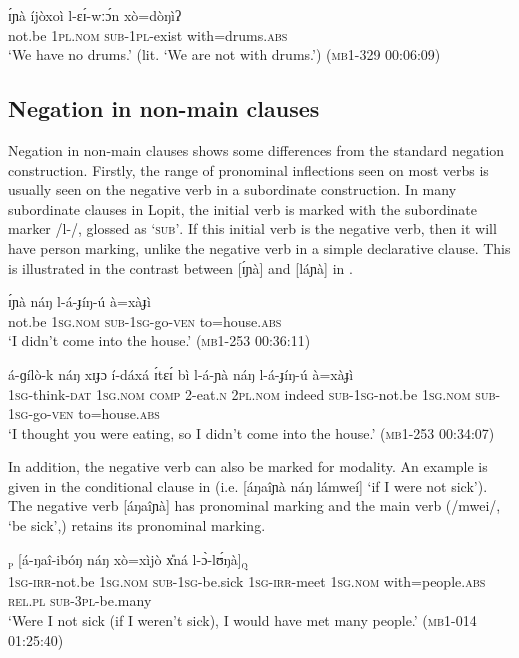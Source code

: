 \documentclass[output=paper,colorlinks,citecolor=brown,draftmode]{langscibook}
\begin{document}
\ea\label{ex:lop:47}
        \gll ɪ́ɲà íjòxoì l-ɛɪ́-wːɔ́n xò=dòŋìʔ  \\ 
             not.be 1\textsc{pl.nom} \textsc{sub-1pl}{}-exist with=drums.\textsc{abs} \\
        \glt ‘We have no drums.’ (lit. ‘We are not with drums.’)   (\textsc{mb1-329} \textsc{00}:06:09)
\z


\subsection{Negation in non-main clauses}
\label{sec:lop:2.4}
Negation in non-main clauses shows some differences from the standard negation construction. Firstly, the range of pronominal inflections seen on most verbs is usually seen on the negative verb in a subordinate construction. In many subordinate clauses in Lopit, the initial verb is marked with the subordinate marker /l-/, glossed as ‘\textsc{sub’}. If this initial verb is the negative verb, then it will have person marking, unlike the negative verb in a simple declarative clause. This is illustrated in the contrast between [ɪ́ɲà]  and [láɲà] in .

\ea\label{ex:lop:48}
        \gll ɪ́ɲà náŋ l-á-ɟíŋ-ú à=xàɟì      \\ 
             not.be 1\textsc{sg.nom} \textsc{sub-1sg}{}-go-\textsc{ven} to=house.\textsc{abs} \\
        \glt ‘I didn’t come into the house.’   (\textsc{mb1-253} \textsc{00:}36:11)
\z

\ea\label{ex:lop:49}
        \gll  á-ɡílò-k náŋ xɪɟɔ í-dáxá  ɪ́tɛɪ́ bì     l-á-ɲà náŋ l-á-ɟíŋ-ú à=xàɟì  \\
             1\textsc{sg}{}-think-\textsc{dat} 1\textsc{sg.nom} \textsc{comp} 2-eat.\textsc{n} 2\textsc{pl.nom} indeed \textsc{sub-1sg}{}-not.be 1\textsc{sg.nom} \textsc{sub-1sg}{}-go-\textsc{ven} to=house.\textsc{abs} \\
        \glt  ‘I thought you were eating, so I didn’t come into the house.’   (\textsc{mb1-253} \textsc{00}:34:07)
\z

In addition, the negative verb can also be marked for modality. An example is given in the conditional clause in  (i.e. [áŋaîɲà náŋ lámweí] ‘if I were not sick’). The negative verb [áŋaîɲà] has pronominal marking and the main verb (/mwei/, ‘be sick’,) retains its pronominal marking.

\ea\label{ex:lop:50}
        \textsubscript{\textsc{p}}     [á-ŋaî-ibóŋ náŋ xò=xìjò x{\U}ná l-ɔ̀-lʊ́ŋà]\textsubscript{\textsc{q}} \\
             1\textsc{sg-irr}{}-not.be 1\textsc{sg.nom} \textsc{sub-1sg}{}-be.sick 1\textsc{sg-irr}{}-meet \textsc{1sg.nom} with=people.\textsc{abs} \textsc{rel.pl} \textsc{sub-3pl}{}-be.many\\
        \glt ‘Were I not sick (if I weren’t sick), I would have met many people.’    (\textsc{mb1-014} \textsc{0}1:25:40)
\z
\end{document}
